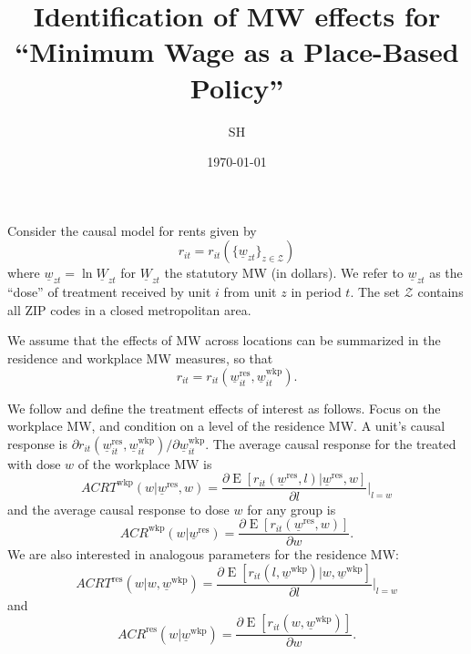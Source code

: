 \documentclass{article}
\title{Identification of MW effects for \\
       ``Minimum Wage as a Place-Based Policy''}
\author{SH}
\date{\today}
\newcommand{\Z}{\mathcal{Z}}
\newcommand{\MW}{\underline{W}}
\newcommand{\mw}{\underline{w}}
\newcommand{\wkp}{\text{wkp}}
\newcommand{\res}{\text{res}}
\DeclareMathOperator{\E}{E}
\begin{document}
\maketitle

Consider the causal model for rents given by
$$r_{it}=r_{it}(\{\mw_{zt}\}_{z\in\Z})$$
where $\mw_{zt}=\ln\MW_{zt}$ for $\MW_{zt}$ the statutory MW (in dollars).
We refer to $\mw_{zt}$ as the ``dose'' of treatment received by unit $i$ from 
unit $z$ in period $t$.
The set $\Z$ contains all ZIP codes in a closed metropolitan area.

We assume that the effects of MW across locations can be summarized in the
residence and workplace MW measures, so that
\begin{equation}\label{eq:causal_model}
    r_{it} = r_{it}(\mw_{it}^{\res}, \mw_{it}^{\wkp}) .
\end{equation}

We follow \textcite{AngristImbens1995} and define the treatment effects of 
interest as follows.
Focus on the workplace MW, and condition on a level of the residence MW.
A unit's causal response is 
$\partial r_{it}(\mw_{it}^{\res}, \mw_{it}^{\wkp})/\partial \mw_{it}^{\wkp} .$
The average causal response for the treated with dose $w$ of the workplace MW is
\begin{equation*}
    ACRT^{\wkp}(w | \mw^{\res}, w) = \frac{\partial \E\left[r_{it}(\mw^{\res}, l)
    |                           \mw^{\res}, w\right]}{\partial l} \Big|_{l=w}
\end{equation*}
and the average causal response to dose $w$ for any group is
\begin{equation*}
    ACR^{\wkp}(w | \mw^{\res}) = \frac{\partial \E\left[r_{it}(\mw^{\res}, w) \right] }{\partial w} .
\end{equation*}
We are also interested in analogous parameters for the residence MW:
\begin{equation*}
    ACRT^{\res}(w | w, \mw^{\wkp}) = \frac{\partial \E\left[r_{it}(l, \mw^{\wkp})
    |                               w, \mw^{\wkp}\right]}{\partial l} \Big|_{l=w}
\end{equation*}
and
\begin{equation*}
    ACR^{\res}(w | \mw^{\wkp}) = \frac{\partial \E\left[r_{it}(w, \mw^{\wkp}) \right] }{\partial w} .
\end{equation*}
\end{document}
